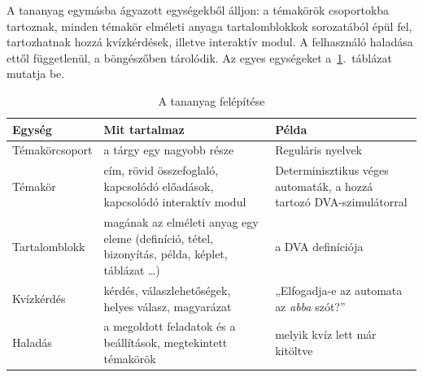 A tananyag egymásba ágyazott egységekből álljon: a témakörök
csoportokba tartoznak, minden témakör elméleti anyaga tartalomblokkok
sorozatából épül fel, tartozhatnak hozzá kvízkérdések, illetve interaktív
modul. A felhasználó haladása ettől függetlenül, a böngészőben
tárolódik. Az egyes egységeket a~\ref{tab:data-logical}.~táblázat
mutatja be.

\begin{table}[H]
    \centering
    \begin{tabularx}{\textwidth}{|l|>{\raggedright\arraybackslash}X|>{\raggedright\arraybackslash}X|}
        \hline
        \textbf{Egység} & \textbf{Mit tartalmaz} & \textbf{Példa} \\
        \hline
        Témakörcsoport & a tárgy egy nagyobb része
                       & Reguláris nyelvek \\ \hline
        Témakör        & cím, rövid összefoglaló, kapcsolódó előadások,
                         kapcsolódó interaktív modul
                       & Determinisztikus véges automaták, a hozzá
                         tartozó DVA-szimulátorral \\ \hline
        Tartalomblokk  & magának az elméleti anyag egy eleme (definíció, tétel,
                         bizonyítás, példa, képlet, táblázat \ldots)
                       & a DVA definíciója \\ \hline
        Kvízkérdés     & kérdés, válaszlehetőségek, helyes válasz,
                         magyarázat
                       & „Elfogadja-e az automata az \emph{abba} szót?” \\ \hline
        Haladás        & a megoldott feladatok és a beállítások, megtekintett témakörök
                       & melyik kvíz lett már kitöltve \\
        \hline
    \end{tabularx}
    \caption{A tananyag felépítése}
    \label{tab:data-logical}
\end{table}


